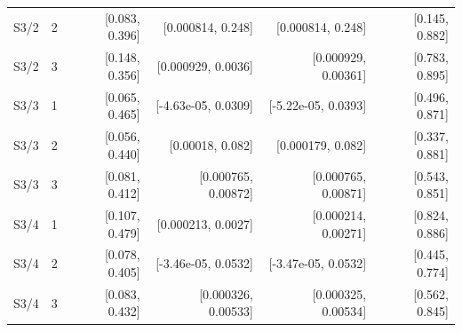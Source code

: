\begin{longtable}{llrrrr}
S3/2 & 2 & [0.083, 0.396] & [0.000814, 0.248] & [0.000814, 0.248] & [0.145, 0.882] \\
S3/2 & 3 & [0.148, 0.356] & [0.000929, 0.0036] & [0.000929, 0.00361] & [0.783, 0.895] \\
S3/3 & 1 & [0.065, 0.465] & [-4.63e-05, 0.0309] & [-5.22e-05, 0.0393] & [0.496, 0.871] \\
S3/3 & 2 & [0.056, 0.440] & [0.00018, 0.082] & [0.000179, 0.082] & [0.337, 0.881] \\
S3/3 & 3 & [0.081, 0.412] & [0.000765, 0.00872] & [0.000765, 0.00871] & [0.543, 0.851] \\
S3/4 & 1 & [0.107, 0.479] & [0.000213, 0.0027] & [0.000214, 0.00271] & [0.824, 0.886] \\
S3/4 & 2 & [0.078, 0.405] & [-3.46e-05, 0.0532] & [-3.47e-05, 0.0532] & [0.445, 0.774] \\
S3/4 & 3 & [0.083, 0.432] & [0.000326, 0.00533] & [0.000325, 0.00534] & [0.562, 0.845] \\
\end{longtable}
